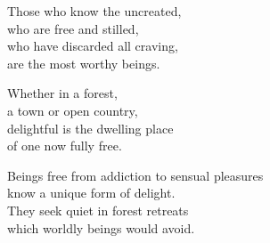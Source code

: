 Those who know the uncreated,\\
who are free and stilled,\\
who have discarded all craving,\\
are the most worthy beings.


Whether in a forest,\\
a town or open country,\\
delightful is the dwelling place\\
of one now fully free.


Beings free from addiction to sensual pleasures\\
know a unique form of delight.\\
They seek quiet in forest retreats\\
which worldly beings would avoid.


